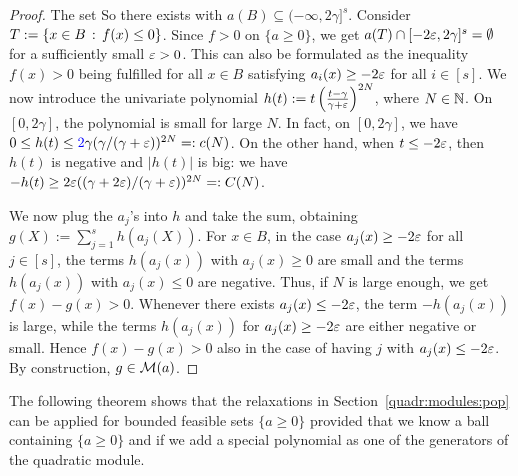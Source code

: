 \begin{proof}
	The set 
	So there exists  with $a(B) \subseteq (-\infty, 2 \gamma]^s$. Consider $T:= \left\{ x \in B \,:\, f(x) \le 0 \right\}$. Since $f> 0$ on  $\{a \ge 0\}$, we get $a(T) \cap [-2 {\operatorname{\varepsilon}}, 2 \gamma]^s = \emptyset$ for a sufficiently small ${\operatorname{\varepsilon}}>0$. This can also be formulated as the inequality $f(x) > 0$ being fulfilled for all $x \in B$ satisfying $a_i(x) \ge -2 {\operatorname{\varepsilon}}$ for all $i \in [s]$. We now introduce the univariate polynomial $h(t) := t \left( \frac{t - \gamma}{\gamma + {\operatorname{\varepsilon}}} \right)^{2N}$, where $N \in \mathbb{N}$. On $[0,2\gamma]$, the polynomial  is small for large $N$. In fact, on $[0,2\gamma]$, we have $0 \le h(t) \le \textcolor{blue}{2} \gamma (\gamma / (\gamma+{\operatorname{\varepsilon}}))^{2N}=:c(N)$. On the other hand, when $t \le - 2 {\operatorname{\varepsilon}}$, then $h(t)$ is negative and $|h(t)|$ is big: we have $- h (t) \ge 2 {\operatorname{\varepsilon}} ((\gamma + 2 {\operatorname{\varepsilon}})/ (\gamma+{\operatorname{\varepsilon}}))^{2N}=:C(N)$.
	
	We now plug the $a_j$'s into $h$ and take the sum, obtaining $g(X) := \sum_{j=1}^s h(a_j(X))$. For $x \in B$, in the case $a_j(x) \ge - 2 {\operatorname{\varepsilon}}$ for all $j \in [s]$, the terms $h(a_j(x))$ with $a_j(x) \ge 0$ are small and the terms $h(a_j(x))$ with $a_j(x) \le 0$ are negative. Thus, if $N$ is large enough, we get $f(x) - g(x) > 0$. Whenever there exists $a_j(x) \le - 2 {\operatorname{\varepsilon}}$, the term $-h(a_j(x))$ is large, while the terms $h(a_j(x))$ for $a_j(x) \ge - 2 {\operatorname{\varepsilon}}$ are either negative or small. Hence $f(x) - g(x) > 0$ also in the case of having $j$ with $a_j(x) \le - 2 {\operatorname{\varepsilon}}$. By construction, $g \in \mathcal{M}(a)$. 
\end{proof}

The following theorem shows that the relaxations in Section~\ref{quadr:modules:pop} can be applied for bounded feasible sets $\{a \ge 0\}$ provided that we know a ball containing $\{a \ge 0\}$ and if we add a special polynomial as one of the generators of the quadratic module. 

